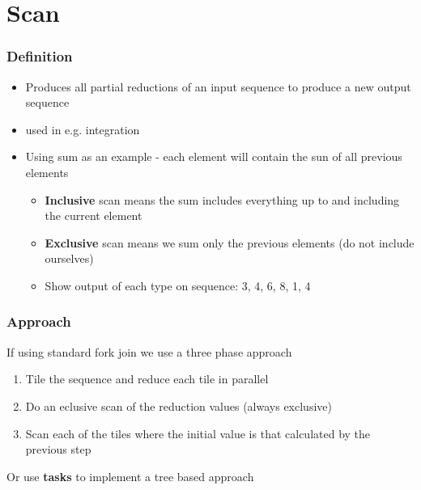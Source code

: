 \documentclass{beamer}
\begin{document}
  \section{Scan}
  \begin{frame}
  	\frametitle{Definition}
  	
  	\begin{itemize}
  		\item Produces all partial reductions of an input sequence to produce a new output sequence
  		\item used in e.g. integration
  		\item Using sum as an example - each element will contain the sun of all previous elements
  		\begin{itemize}
  			\item \textbf{Inclusive} scan means the sum includes everything up to and including the current element
  			\item \textbf{Exclusive} scan means we sum only the previous elements (do not include ourselves)
  			\item Show output of each type on sequence: 3, 4, 6, 8, 1, 4
  		\end{itemize}
  	\end{itemize}
  \end{frame}
   \begin{frame}
   	\frametitle{Approach}
   	If using standard fork join we use a three phase approach
   	\begin{enumerate}
   		\item Tile the sequence and reduce each tile in parallel
   		\item Do an eclusive scan of the reduction values (always exclusive)
   		\item Scan each of the tiles where the initial value is that calculated by the previous step
   	\end{enumerate}
   	Or use \textbf{tasks} to implement a tree based approach
   \end{frame}
\end{document}
